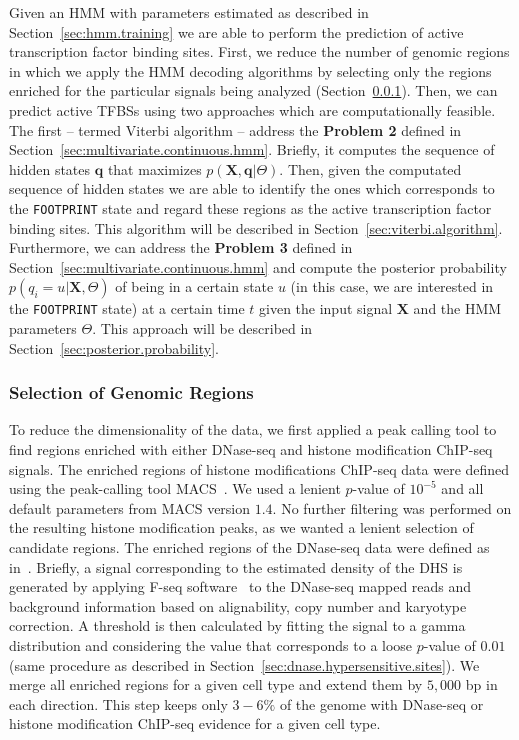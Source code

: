 Given an HMM with parameters estimated as described in Section~\ref{sec:hmm.training} we are able to perform the prediction of active transcription factor binding sites. First, we reduce the number of genomic regions in which we apply the HMM decoding algorithms by selecting only the regions enriched for the particular signals being analyzed (Section~\ref{sec:selection.genomic.regions}). Then, we can predict active TFBSs using two approaches which are computationally feasible. The first -- termed Viterbi algorithm -- address the {\bf Problem 2} defined in Section~\ref{sec:multivariate.continuous.hmm}. Briefly, it computes the sequence of hidden states $ \mathbf{q} $ that maximizes $ p\left( \mathbf{X}, \mathbf{q} | \Theta \right) $. Then, given the computated sequence of hidden states we are able to identify the ones which corresponds to the {\tt FOOTPRINT} state and regard these regions as the active transcription factor binding sites. This algorithm will be described in Section~\ref{sec:viterbi.algorithm}. Furthermore, we can address the {\bf Problem 3} defined in Section~\ref{sec:multivariate.continuous.hmm} and compute the posterior probability $ p(q_i = u | \mathbf{X}, \Theta) $ of being in a certain state $u$ (in this case, we are interested in the {\tt FOOTPRINT} state) at a certain time $t$ given the input signal $\mathbf{X}$ and the HMM parameters $\Theta$. This approach will be described in Section~\ref{sec:posterior.probability}.

\subsubsection{Selection of Genomic Regions}
\label{sec:selection.genomic.regions}

To reduce the dimensionality of the data, we first applied a peak calling tool to find regions enriched with either DNase-seq and histone modification ChIP-seq signals. The enriched regions of histone modifications ChIP-seq data were defined using the peak-calling tool MACS~\cite{zhang2008}. We used a lenient $p$-value of $ 10^{-5} $ and all default parameters from MACS version $1.4$. No further filtering was performed on the resulting histone modification peaks, as we wanted a lenient selection of candidate regions. The enriched regions of the DNase-seq data were defined as in~\cite{boyle2011}. Briefly, a signal corresponding to the estimated density of the DHS is generated by applying F-seq software~\cite{boyle2008b} to the DNase-seq mapped reads and background information based on alignability, copy number and karyotype correction. A threshold is then calculated by fitting the signal to a gamma distribution and considering the value that corresponds to a loose $p$-value of $ 0.01 $ (same procedure as described in Section~\ref{sec:dnase.hypersensitive.sites}). We merge all enriched regions for a given cell type and extend them by $5,000$ bp in each direction. This step keeps only $3-6\%$ of the genome with DNase-seq or histone modification ChIP-seq evidence for a given cell type.

